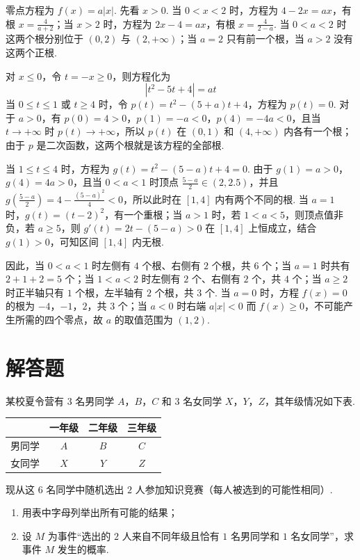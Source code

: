 
\begin{solution}
零点方程为 \(f(x)=a|x|\). 先看 \(x>0\). 当 \(0<x<2\) 时，方程为 \(4-2x=ax\)，有根 \(x=\frac4{a+2}\)；当 \(x>2\) 时，方程为 \(2x-4=ax\)，有根 \(x=\frac4{2-a}\). 当 \(0<a<2\) 时这两个根分别位于 \((0,2)\) 与 \((2,+\infty)\)；当 \(a=2\) 只有前一个根，当 \(a>2\) 没有这两个正根.

对 \(x\leqslant0\)，令 \(t=-x\geqslant0\)，则方程化为
\[
\left|t^2-5t+4\right|=at
\]
当 \(0\leqslant t\leqslant1\) 或 \(t\geqslant4\) 时，令 \(p(t)=t^2-(5+a)t+4\)，方程为 \(p(t)=0\). 对于 \(a>0\)，有 \(p(0)=4>0\)，\(p(1)=-a<0\)，\(p(4)=-4a<0\)，且当 \(t\to+\infty\) 时 \(p(t)\to+\infty\)，所以 \(p(t)\) 在 \((0,1)\) 和 \((4,+\infty)\) 内各有一个根；由于 \(p\) 是二次函数，这两个根就是该方程的全部根.

当 \(1\leqslant t\leqslant4\) 时，方程为 \(g(t)=t^2-(5-a)t+4=0\). 由于 \(g(1)=a>0\)，\(g(4)=4a>0\)，且当 \(0<a<1\) 时顶点 \(\frac{5-a}{2}\in(2,2.5)\)，并且 \(g\left(\frac{5-a}{2}\right)=4-\frac{(5-a)^2}{4}<0\)，所以此时在 \([1,4]\) 内有两个不同的根. 当 \(a=1\) 时，\(g(t)=(t-2)^2\)，有一个重根；当 \(a>1\) 时，若 \(1<a<5\)，则顶点值非负，若 \(a\geqslant5\)，则 \(g'(t)=2t-(5-a)>0\) 在 \([1,4]\) 上恒成立，结合 \(g(1)>0\)，可知区间 \([1,4]\) 内无根.

因此，当 \(0<a<1\) 时左侧有 \(4\) 个根、右侧有 \(2\) 个根，共 \(6\) 个；当 \(a=1\) 时共有 \(2+1+2=5\) 个；当 \(1<a<2\) 时左侧有 \(2\) 个、右侧有 \(2\) 个，共 \(4\) 个；当 \(a\geqslant2\) 时正半轴只有 \(1\) 个根，左半轴有 \(2\) 个根，共 \(3\) 个. 当 \(a=0\) 时，方程 \(f(x)=0\) 的根为 \(-4\)，\(-1\)，\(2\)，共 \(3\) 个；当 \(a<0\) 时右端 \(a|x|<0\) 而 \(f(x)\geqslant0\)，不可能产生所需的四个零点，故 \(a\) 的取值范围为 \((1,2)\).
\end{solution}

\section{解答题}

\begin{problem}
某校夏令营有 \(3\) 名男同学 \(A\)，\(B\)，\(C\) 和 \(3\) 名女同学 \(X\)，\(Y\)，\(Z\)，其年级情况如下表.

\begin{center}
\begin{tabular}{c|ccc}
\hline
 & 一年级 & 二年级 & 三年级 \\
\hline
男同学 & \(A\) & \(B\) & \(C\) \\
\hline
女同学 & \(X\) & \(Y\) & \(Z\) \\
\hline
\end{tabular}
\end{center}

现从这 \(6\) 名同学中随机选出 \(2\) 人参加知识竞赛（每人被选到的可能性相同）.

\begin{enumerate}
\item 用表中字母列举出所有可能的结果；
\item 设 \(M\) 为事件“选出的 \(2\) 人来自不同年级且恰有 \(1\) 名男同学和 \(1\) 名女同学”，求事件 \(M\) 发生的概率.
\end{enumerate}
\end{problem}

